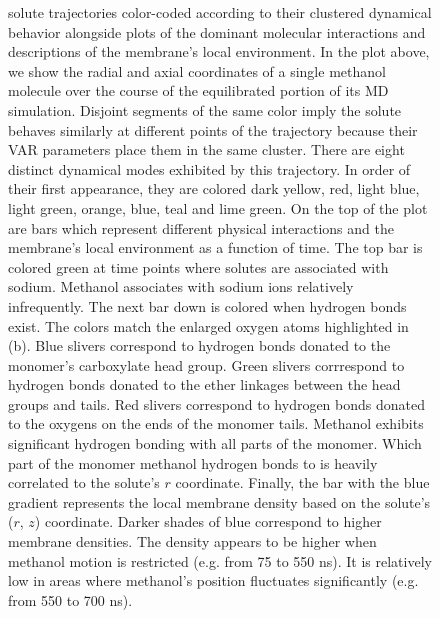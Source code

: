 \documentclass{article}
\begin{document}
\begin{figure}
{  solute trajectories color-coded according to their clustered dynamical behavior alongside
  plots of the dominant molecular interactions and descriptions of the membrane's local 
  environment. In the plot above, we show the radial and axial coordinates of a single
  methanol molecule over the course of the equilibrated portion of its MD simulation.
  Disjoint segments of the same color imply the solute behaves similarly at different 
  points of the trajectory because their VAR parameters place them in the same cluster. 
  There are eight distinct dynamical modes exhibited by this trajectory. In order
  of their first appearance, they are colored dark yellow, red, light blue, light green,
  orange, blue, teal and lime green. On the top of the plot are bars which represent different
  physical interactions and the membrane's local environment as a function of time. The top 
  bar is colored green at time points where solutes are associated with sodium. Methanol 
  associates with sodium ions relatively infrequently. The next bar down is colored when hydrogen
  bonds exist. The colors match the enlarged oxygen atoms highlighted in (b). Blue slivers
  correspond to hydrogen bonds donated to the monomer's carboxylate head group. Green slivers
  corrrespond to  hydrogen bonds donated to the ether linkages between the head groups
  and tails. Red slivers correspond to hydrogen bonds donated to the oxygens on the ends
  of the monomer tails. Methanol exhibits significant hydrogen bonding with all parts of
  the monomer. Which part of the monomer methanol hydrogen bonds to is heavily correlated
  to the solute's $r$ coordinate. Finally, the bar with the blue gradient represents the local 
  membrane density based on the solute's ($r$, $z$) coordinate. Darker shades of blue
  correspond to higher membrane densities. The density appears to be higher when methanol
  motion is restricted (e.g. from 75 to 550 ns). It is relatively low in areas where methanol's
  position fluctuates significantly (e.g. from 550 to 700 ns). 
  }\label{fig:mechanism_map}
  \end{figure}
\end{document}
